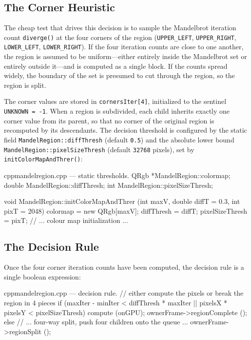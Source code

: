 \documentclass[
	english,
	letterpaper, oneside
]{article}
\begin{document}
\subsection{The Corner Heuristic}

The cheap test that drives this decision is to sample the Mandelbrot
iteration count \texttt{diverge()} at the four corners of the region
(\texttt{UPPER\_LEFT}, \texttt{UPPER\_RIGHT}, \texttt{LOWER\_LEFT},
\texttt{LOWER\_RIGHT}). If the four iteration counts are close to one
another, the region is assumed to be uniform—either entirely inside the
Mandelbrot set or entirely outside it—and is computed as a single block.
If the counts spread widely, the boundary of the set is presumed to cut
through the region, so the region is split.

The corner values are stored in \texttt{cornersIter[4]}, initialized to
the sentinel \texttt{UNKNOWN = -1}. When a region is subdivided, each
child inherits exactly one corner value from its parent, so that no
corner of the original region is recomputed by its descendants. The
decision threshold is configured by the static field
\texttt{MandelRegion::diffThresh} (default \texttt{0.5}) and the
absolute lower bound \texttt{MandelRegion::pixelSizeThresh}
(default \texttt{32768} pixels), set by
\texttt{initColorMapAndThrer()}:

\begin{sourcecode}{cpp}{mandelregion.cpp — static thresholds.}
QRgb *MandelRegion::colormap;
double MandelRegion::diffThresh;
int MandelRegion::pixelSizeThresh;

void MandelRegion::initColorMapAndThrer (int maxV,
                                         double diffT = 0.3,
                                         int    pixT  = 2048)
{
  colormap = new QRgb[maxV];
  diffThresh = diffT;
  pixelSizeThresh = pixT;
  // ... colour map initialization ...
}
\end{sourcecode}

\subsection{The Decision Rule}

Once the four corner iteration counts have been computed, the decision
rule is a single boolean expression:

\begin{sourcecode}{cpp}{mandelregion.cpp — decision rule.}
// either compute the pixels or break the region in 4 pieces
if (maxIter - minIter < diffThresh * maxIter
    || pixelsX * pixelsY < pixelSizeThresh)
  {
    compute (onGPU);
    ownerFrame->regionComplete ();
  }
else
  {
    // ... four-way split, push four children onto the queue ...
    ownerFrame->regionSplit ();
  }
\end{sourcecode}
\end{document}
